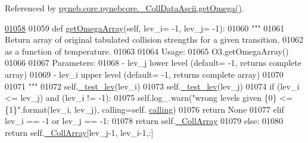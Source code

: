 Referenced by \hyperlink{pynebcore_8py_source_l01082}{pyneb.\-core.\-pynebcore.\-\_\-\-Coll\-Data\-Ascii.\-get\-Omega()}.


\begin{DoxyCode}
\hypertarget{classpyneb_1_1core_1_1pynebcore_1_1___coll_data_ascii_l01058}{}\hyperlink{classpyneb_1_1core_1_1pynebcore_1_1___coll_data_ascii_ac78bf2ddca80543884f09c2924308351}{01058} 
01059     \textcolor{keyword}{def }\hyperlink{classpyneb_1_1core_1_1pynebcore_1_1___coll_data_ascii_ac78bf2ddca80543884f09c2924308351}{getOmegaArray}(self, lev\_i= -1, lev\_j= -1):
01060         \textcolor{stringliteral}{"""}
01061 \textcolor{stringliteral}{        Return array of original tabulated collision strengths for a given transition, }
01062 \textcolor{stringliteral}{            as a function of temperature.}
01063 \textcolor{stringliteral}{        }
01064 \textcolor{stringliteral}{        Usage:}
01065 \textcolor{stringliteral}{            O3.getOmegaArray()}
01066 \textcolor{stringliteral}{        }
01067 \textcolor{stringliteral}{        Parameters:}
01068 \textcolor{stringliteral}{            - lev\_j  lower level (default= -1, returns complete array)}
01069 \textcolor{stringliteral}{            - lev\_i  upper level (default= -1, returns complete array)}
01070 \textcolor{stringliteral}{}
01071 \textcolor{stringliteral}{        """}
01072         self.\hyperlink{classpyneb_1_1core_1_1pynebcore_1_1___coll_data_ascii_ab0aa6c61eca4fb3b526265776caab5b4}{\_test\_lev}(lev\_i)
01073         self.\hyperlink{classpyneb_1_1core_1_1pynebcore_1_1___coll_data_ascii_ab0aa6c61eca4fb3b526265776caab5b4}{\_test\_lev}(lev\_j)
01074         \textcolor{keywordflow}{if} (lev\_i <= lev\_j) \textcolor{keywordflow}{and} (lev\_i != -1):
01075             self.log\_.warn(\textcolor{stringliteral}{"wrong levels given \{0\} <= \{1\}"}.format(lev\_i, lev\_j), calling=self.
      \hyperlink{classpyneb_1_1core_1_1pynebcore_1_1___coll_data_ascii_a08efc5898f4e03a1b7702d85f909e188}{calling})
01076             \textcolor{keywordflow}{return} \textcolor{keywordtype}{None}
01077         \textcolor{keywordflow}{elif} lev\_i == -1 \textcolor{keywordflow}{or} lev\_j == -1:
01078             \textcolor{keywordflow}{return} self.\hyperlink{classpyneb_1_1core_1_1pynebcore_1_1___coll_data_ascii_a01539063e6fade51b407dba1faa011c6}{\_CollArray}
01079         \textcolor{keywordflow}{else}:
01080             \textcolor{keywordflow}{return} self.\hyperlink{classpyneb_1_1core_1_1pynebcore_1_1___coll_data_ascii_a01539063e6fade51b407dba1faa011c6}{\_CollArray}[lev\_j-1, lev\_i-1,:]
        
\end{DoxyCode}

